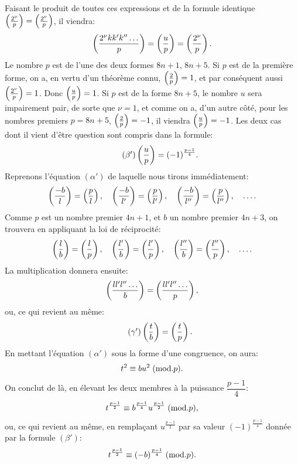 \noindent
Faisant le produit de toutes ces expressions et de la formule identique
$\left(\frac{2^\nu}{p}\right)=\left(\frac{2^\nu}{p}\right)$, il viendra:
\[
\left(\frac{2^\nu kk'k''\ldots}{p}\right)=\left(\frac{u}{p}\right)=\left(\frac{2^\nu}{p}\right).
\]
Le nombre $p$ est de l'une des deux formes $8n+1$, $8n+5$. Si $p$ est de la
première forme, on a, en vertu d'un théorème connu, $\left(\frac{2}{p}\right)=1$, et par conséquent
 aussi $\left(\frac{2^\nu}{p}\right)=1$. Donc $\left(\frac{u}{p}\right)=1$. Si $p$ est de la forme $8n+5$, le
nombre $u$ sera impairement pair, de sorte que $\nu=1$, et comme on a, d'un
autre côté, pour les nombres premiers $p=8n+5$, $\left(\frac{2}{p}\right)=-1$, il viendra
$\left(\frac{u}{p}\right)=-1$. Les deux cas dont il vient d'être question sont compris dans
la formule:
\begin{equation*}\tag{$\beta'$}
\left(\frac{u}{p}\right)=(-1)^{\frac{p-1}{4}}.
\end{equation*}
Reprenons l'équation $(\alpha')$ de laquelle nous tirons immédiatement:
\[
\left(\frac{-b}{l}\right)=\left(\frac{p}{l}\right),\quad\left(\frac{-b}{l'}\right)=\left(\frac{p}{l'}\right),\quad
\left(\frac{-b}{l''}\right)=\left(\frac{p}{l''}\right),\quad\ldots.
\]
Comme $p$ est un nombre premier $4n+1$, et $b$ un nombre premier $4n+3$, on
trouvera en appliquant la loi de réciprocité:
\[
\left(\frac{l}{b}\right)=\left(\frac{l}{p}\right),\quad\left(\frac{l'}{b}\right)=\left(\frac{l'}{p}\right),\quad
\left(\frac{l''}{b}\right)=\left(\frac{l''}{p}\right),\quad\ldots.
\]
La multiplication donnera ensuite:
\[
\left(\frac{ll'l''\ldots}{b}\right)=\left(\frac{ll'l''\ldots}{p}\right),
\]
ou, ce qui revient au même:
\begin{equation*}\tag{$\gamma'$}
\left(\frac{t}{b}\right)=\left(\frac{t}{p}\right).
\end{equation*}
En mettant l'équation $(\alpha')$ sous la forme d'une congruence, on aura:
\[
t^2\equiv bu^2\;(\mathrm{mod}.p).
\]
On conclut de là, en élevant les deux membres à la puissance $\dfrac{p-1}{4}$:
\[
t^{\frac{p-1}{2}}\equiv b^{\frac{p-1}{4}}u^{\frac{p-1}{2}}\;(\mathrm{mod}.p),
\]
ou, ce qui revient au même, en remplaçant $u^{\frac{p-1}{2}}$ par sa valeur $(-1)^{\frac{p-1}{4}}$ donnée
par la formule $(\beta')$:
\[
t^{\frac{p-1}{2}}\equiv(-b)^{\frac{p-1}{4}}\;(\mathrm{mod}.p).
\]
